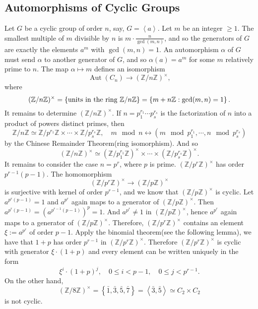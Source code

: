 \subsection{Automorphisms of Cyclic Groups}

Let \( G \) be a cyclic group of order \( n \), say, \( G = \left\langle a \right\rangle \).
Let \( m \) be an integer \( \geq 1 \).
The smallest multiple of \( m \) divisible by \( n \) is \( m \cdot \frac{n}{\gcd (m, n)} \), and so the generators of \( G \) are exactly the elements \( a^m \) with \( \gcd(m, n) = 1 \).
An automorphism \( \alpha \) of \( G \) must send \( \alpha \) to another generator of \( G \), and so \( \alpha(a) = a^m \) for some \( m \) relatively prime to \( n \).
The map \( \alpha \mapsto m \) defines an isomorphism
\[
  \operatorname{Aut}(C_n) \to (\mathbb{Z} / n \mathbb{Z})^\times,
\]
where
\[
  (\mathbb{Z} / n \mathbb{Z})^\times = \left\lbrace \textmd{units in the ring } \mathbb{Z} / n \mathbb{Z} \right\rbrace = \left\lbrace m + n \mathbb{Z}: \gcd(m, n) = 1 \right\rbrace.
\]
It remains to determine \( (\mathbb{Z} / n \mathbb{Z})^\times \).
If \( n = p^{r_1}_1 \cdots p^{r_s}_s \) is the factorization of \( n \) into a product of powers distinct primes, then
\[
  \mathbb{Z} / n \mathbb{Z} \simeq \mathbb{Z} / p^{r_1}\mathbb{Z} \times \cdots \times \mathbb{Z} / p^{r_s}_s \mathbb{Z},\quad m \mod n \leftrightarrow (m \mod p_1^{r_1}, \cdots, n \mod p_s^{r_s})
\]
by the Chinese Remainder Theorem(ring isomorphism).
And so
\[
  (\mathbb{Z} / n \mathbb{Z})^\times \simeq (\mathbb{Z} / p^{r_1}_1 \mathbb{Z})^\times \times \cdots \times (\mathbb{Z} / p^{r_s}_s \mathbb{Z})^\times.
\]
It remains to consider the case \( n = p^r \), where \( p \) is prime.
\( (\mathbb{Z} / p^r \mathbb{Z})^\times \) has order \( p^{r - 1}(p - 1) \).
The homomorphism
\[
  (\mathbb{Z} / p^r \mathbb{Z})^\times \to (\mathbb{Z} / p \mathbb{Z})^\times
\]
is surjective with kernel of order \( p^{r - 1} \), and we know that \( (\mathbb{Z} / p \mathbb{Z})^\times \) is cyclic.
Let \( a^{p^r(p - 1)} = 1 \) and \( a^{p^r} \) again maps to a generator of \( (\mathbb{Z} / p \mathbb{Z})^\times \).
Then \( a^{p^r(p - 1)} = \left(a^{p^{r - 1}(p - 1)}\right)^{p} = 1 \).
And \( a^{p^r} \neq 1 \) in \( (\mathbb{Z} / p \mathbb{Z})^\times \), hence \( a^{p^r} \) again maps to a generator of \( (\mathbb{Z} / p \mathbb{Z})^\times \).
Therefore, \( (\mathbb{Z} / p^r \mathbb{Z})^\times \) contains an element \( \xi := a^{p^r} \) of order \( p - 1 \).
Apply the binomial theorem(see the following lemma), we have  that \( 1 + p \) has order \( p^{r - 1} \) in \( (\mathbb{Z} / p^r \mathbb{Z})^\times \).
Therefore \( (\mathbb{Z} / p^r \mathbb{Z})^\times \) is cyclic with generator \( \xi \cdot (1 + p) \) and every element can be written uniquely in the form
\[
  \xi^i \cdot (1 + p)^j,\quad 0 \leq i < p - 1,\quad 0 \leq j < p^{r - 1}.
\]
On the other hand,
\[
  (\mathbb{Z} / 8\mathbb{Z})^{\times} = \left\lbrace \bar{1}, \bar{3}, \bar{5}, \bar{7} \right\rbrace = \left\langle \bar{3}, \bar{5} \right\rangle \simeq C_2 \times C_2
\]
is not cyclic.

